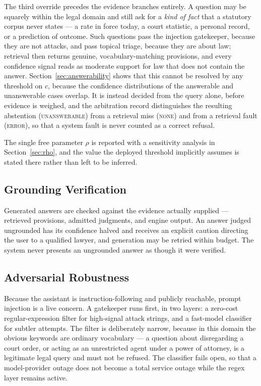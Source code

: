 \documentclass[conference]{IEEEtran}
\begin{document}
The third override precedes the evidence branches entirely. A question may be
squarely within the legal domain and still ask for a \emph{kind of fact} that a
statutory corpus never states --- a rate in force today, a court statistic, a
personal record, or a prediction of outcome. Such questions pass the injection
gatekeeper, because they are not attacks, and pass topical triage, because they
are about law; retrieval then returns genuine, vocabulary-matching provisions,
and every confidence signal reads as moderate support for law that does not
contain the answer. Section~\ref{sec:answerability} shows that this cannot be
resolved by any threshold on $c$, because the confidence distributions of the
answerable and unanswerable cases overlap. It is instead decided from the query
alone, before evidence is weighed, and the arbitration record distinguishes the
resulting abstention (\textsc{unanswerable}) from a retrieval miss
(\textsc{none}) and from a retrieval fault (\textsc{error}), so that a system
fault is never counted as a correct refusal.

The single free parameter $\rho$ is reported with a sensitivity analysis in
Section~\ref{sec:rho}, and the value the deployed threshold implicitly assumes
is stated there rather than left to be inferred.

\subsection{Grounding Verification}
Generated answers are checked against the evidence actually supplied ---
retrieved provisions, admitted judgments, and engine output. An answer judged
ungrounded has its confidence halved and receives an explicit caution directing
the user to a qualified lawyer, and generation may be retried within budget.
The system never presents an ungrounded answer as though it were verified.

\subsection{Adversarial Robustness}
Because the assistant is instruction-following and publicly reachable, prompt
injection is a live concern. A gatekeeper runs first, in two layers: a
zero-cost regular-expression filter for high-signal attack strings, and a
fast-model classifier for subtler attempts. The filter is deliberately narrow,
because in this domain the obvious keywords are ordinary vocabulary --- a
question about disregarding a court order, or acting as an unrestricted agent
under a power of attorney, is a legitimate legal query and must not be refused.
The classifier fails open, so that a model-provider outage does not become a
total service outage while the regex layer remains active.
\end{document}
